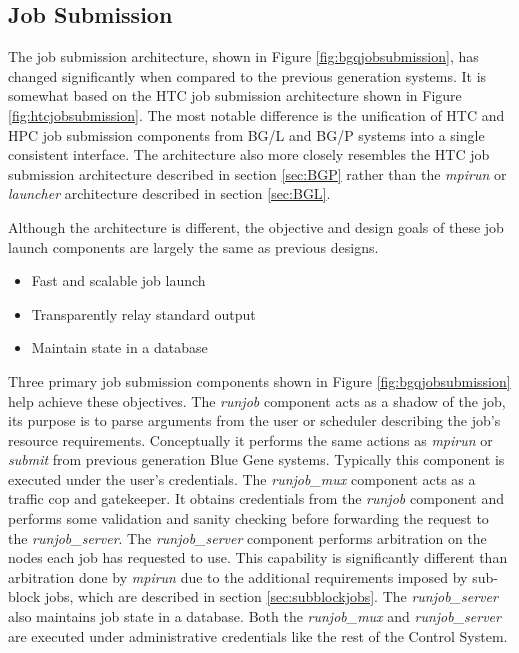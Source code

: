 \subsection{Job Submission}
\label{sec:bgqjobsubmission}

The job submission architecture, shown in Figure \ref{fig:bgqjobsubmission}, has changed significantly 
when compared to the previous generation systems. It is somewhat based on the HTC job submission architecture 
shown in Figure \ref{fig:htcjobsubmission}. The most notable difference is the unification of HTC and HPC 
job submission components from BG/L and BG/P systems into a single consistent interface. The architecture 
also more closely resembles the HTC job submission architecture described in section \ref{sec:BGP} rather 
than the \emph{mpirun} or \emph{launcher} architecture described in section \ref{sec:BGL}.

Although the architecture is different, the objective and design goals of these job launch components are 
largely the same as previous designs. 

\begin{itemize}
\item{Fast and scalable job launch}
\item{Transparently relay standard output}
\item{Maintain state in a database}
\end{itemize}

\noindent
Three primary job submission components shown in Figure \ref{fig:bgqjobsubmission} help achieve these 
objectives. The \emph{runjob} component acts as a shadow of the job, its purpose is to parse arguments from 
the user or scheduler describing the job's resource requirements. Conceptually it performs the same actions 
as \emph{mpirun} or \emph{submit} from previous generation Blue Gene systems. Typically this component is 
executed under the user's credentials. The \emph{runjob\_mux} component acts as a traffic cop and gatekeeper. 
It obtains credentials from the \emph{runjob} component and performs some validation and sanity checking 
before forwarding the request to the \emph{runjob\_server}. The \emph{runjob\_server} component performs 
arbitration on the nodes each job has requested to use. This capability is significantly different than 
arbitration done by \emph{mpirun} due to the additional requirements imposed by sub-block jobs, which are 
described in section \ref{sec:subblockjobs}. The \emph{runjob\_server} also maintains job state in a database. 
Both the \emph{runjob\_mux} and \emph{runjob\_server} are executed under administrative credentials like 
the rest of the Control System.

